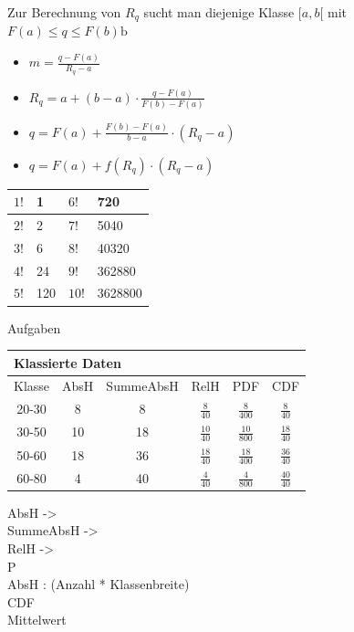 \documentclass[10pt]{article}
\begin{document}
Zur Berechnung von $R_{q}$ sucht man diejenige Klasse $[a, b[$ mit $F(a) \leq q \leq F(b) \mathrm{b}$

\begin{itemize}
  \item $m=\frac{q-F(a)}{R_{q}-a}$
  \item $R_{q}=a+(b-a) \cdot \frac{q-F(a)}{F(b)-F(a)}$
  \item $q=F(a)+\frac{F(b)-F(a)}{b-a} \cdot\left(R_{q}-a\right)$
  \item $q=F(a)+f\left(R_{q}\right) \cdot\left(R_{q}-a\right)$
\end{itemize}

\begin{center}
\begin{tabular}{|l|l|l|l|}
\hline
$1!$ & 1 & $6!$ & 720 \\
\hline
$2!$ & 2 & $7!$ & 5040 \\
\hline
$3!$ & 6 & $8!$ & 40320 \\
\hline
$4!$ & 24 & $9!$ & 362880 \\
\hline
$5!$ & 120 & $10!$ & 3628800 \\
\hline
\end{tabular}
\end{center}

Aufgaben

\begin{center}
\begin{tabular}{|c|c|c|c|c|c|}
\hline
\multicolumn{6}{|l|}{Klassierte Daten} \\
\hline
Klasse & AbsH & SummeAbsH & RelH & PDF & CDF \\
\hline
20-30 & 8 & 8 & $\frac{8}{40}$ & $\frac{8}{400}$ & $\frac{8}{40}$ \\
\hline
30-50 & 10 & 18 & $\frac{10}{40}$ & $\frac{10}{800}$ & $\frac{18}{40}$ \\
\hline
50-60 & 18 & 36 & $\frac{18}{40}$ & $\frac{18}{400}$ & $\frac{36}{40}$ \\
\hline
60-80 & 4 & 40 & $\frac{4}{40}$ & $\frac{4}{800}$ & $\frac{40}{40}$ \\
\hline
\end{tabular}
\end{center}

AbsH ->\\
SummeAbsH ->\\
RelH ->\\
P\\
AbsH : (Anzahl * Klassenbreite)\\
CDF\\
Mittelwert
\end{document}
